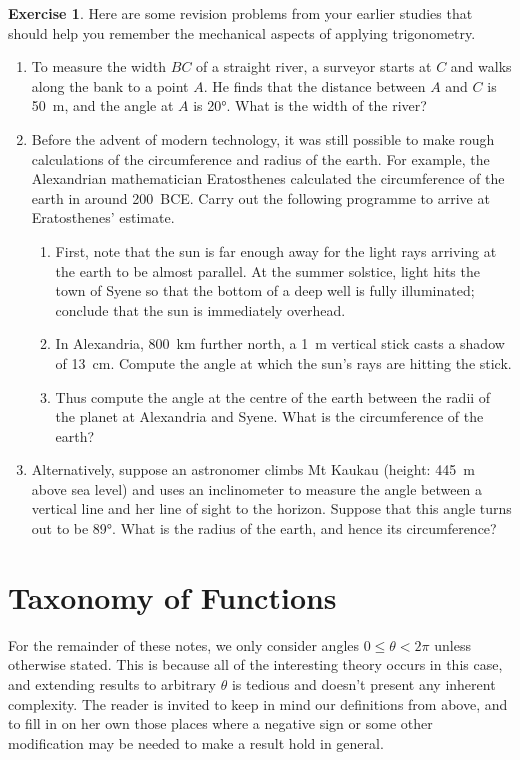 \documentclass[a4paper,leqno]{article}
\numberwithin{equation}{section}
\theoremstyle{definition}
\newtheorem{exercise}[equation]{Exercise}
\theoremstyle{remark}
\begin{document}
\begin{exercise}
  Here are some revision problems from your earlier studies that should help you remember
  the mechanical aspects of applying trigonometry.
  \begin{enumerate}
    \item To measure the width $ BC $ of a straight river, a surveyor starts at $ C $ and walks
          along the bank to a point $ A $. He finds that the distance between $ A $ and $ C $
          is \SI{50}{\metre}, and the angle at $ A $ is \ang{20}. What is the width of the river?
    \item Before the advent of modern technology, it was still possible to make rough calculations
          of the circumference and radius of the earth. For example, the Alexandrian mathematician
          Eratosthenes calculated the circumference of the earth in around 200~BCE. Carry out the
          following programme to arrive at Eratosthenes' estimate.
          \begin{enumerate}
            \item First, note that the sun is far enough away for the light rays arriving at the earth to be almost
                  parallel. At the summer solstice, light hits the town of Syene so that the bottom
                  of a deep well is fully illuminated; conclude that the sun is immediately overhead.
            \item In Alexandria, \SI{800}{\kilo\metre} further north, a \SI{1}{\metre} vertical stick casts
                  a shadow of \SI{13}{\centi\metre}. Compute the angle at which the sun's rays are hitting
                  the stick.
            \item Thus compute the angle at the centre of the earth between the radii of the planet at Alexandria
                  and Syene. What is the circumference of the earth?
          \end{enumerate}
    \item Alternatively, suppose an astronomer climbs Mt Kaukau (height: \SI{445}{\metre} above sea level) and uses
          an inclinometer to measure the angle between a vertical line and her line of sight to the horizon. Suppose
          that this angle turns out to be \ang{89}. What is the radius of the earth, and hence its circumference?
  \end{enumerate}
\end{exercise}

\section{Taxonomy of Functions}
For the remainder of these notes, we only consider angles $ 0 \leq \theta < 2\pi $ unless otherwise stated. This is because
all of the interesting theory occurs in this case, and extending results to arbitrary $ \theta $ is tedious and doesn't present
any inherent complexity. The reader is invited to keep in mind our definitions from above, and to fill in on her own those
places where a negative sign or some other modification may be needed to make a result hold in general.
\end{document}

